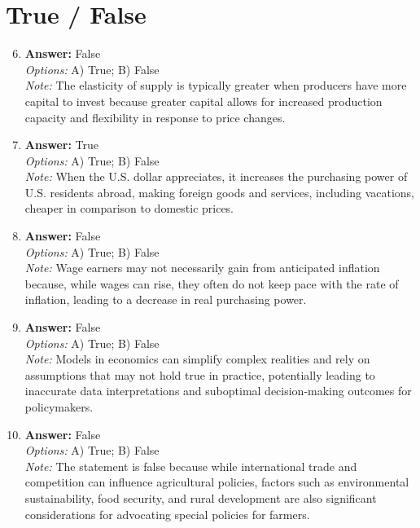 \documentclass[12pt]{article}
\begin{document}
\section*{True / False}
\begin{enumerate}[label=\arabic*.]
\setcounter{enumi}{5}
\item \textbf{Answer:} False
\\ \textit{Options:} A) True; B) False
\\ \textit{Note:} The elasticity of supply is typically greater when producers have more capital to invest because greater capital allows for increased production capacity and flexibility in response to price changes.
\item \textbf{Answer:} True
\\ \textit{Options:} A) True; B) False
\\ \textit{Note:} When the U.S. dollar appreciates, it increases the purchasing power of U.S. residents abroad, making foreign goods and services, including vacations, cheaper in comparison to domestic prices.
\item \textbf{Answer:} False
\\ \textit{Options:} A) True; B) False
\\ \textit{Note:} Wage earners may not necessarily gain from anticipated inflation because, while wages can rise, they often do not keep pace with the rate of inflation, leading to a decrease in real purchasing power.
\item \textbf{Answer:} False
\\ \textit{Options:} A) True; B) False
\\ \textit{Note:} Models in economics can simplify complex realities and rely on assumptions that may not hold true in practice, potentially leading to inaccurate data interpretations and suboptimal decision-making outcomes for policymakers.
\item \textbf{Answer:} False
\\ \textit{Options:} A) True; B) False
\\ \textit{Note:} The statement is false because while international trade and competition can influence agricultural policies, factors such as environmental sustainability, food security, and rural development are also significant considerations for advocating special policies for farmers.
\end{enumerate}
\end{document}
